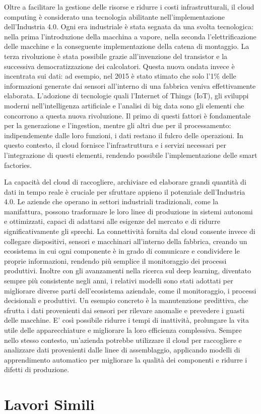 Oltre a facilitare la gestione delle risorse e ridurre i costi infrastrutturali, il cloud computing è considerato una tecnologia abilitante nell'implementazione dell’Industria 4.0. Ogni era industriale è stata segnata da una svolta tecnologica: nella prima l'introduzione della macchina a vapore, nella seconda l'elettrificazione delle macchine e la conseguente implementazione della catena di montaggio. La terza rivoluzione è stata possibile grazie all'invenzione del transistor e la successiva democratizzazione dei calcolatori. Questa nuova ondata invece è incentrata sui dati: ad esempio, nel 2015 è stato stimato che solo l'1\% delle informazioni generate dai sensori all'interno di una fabbrica veniva effettivamente elaborata\cite{b6mckinsey}.  L’adozione di tecnologie quali l’Internet of Things (IoT), gli sviluppi moderni nell'intelligenza artificiale e l’analisi di big data sono gli elementi che concorrono a questa nuova rivoluzione. Il primo di questi fattori è fondamentale per la generazione e l'ingestion, mentre gli altri due per il processamento: indipendemente dalle loro funzioni, i dati restano il fulcro delle operazioni. In questo contesto, il cloud fornisce l'infrastruttura e i servizi necessari per l'integrazione di questi elementi, rendendo possibile l'implementazione delle smart factories. 

La capacità del cloud di raccogliere, archiviare ed elaborare grandi quantità di dati in tempo reale è cruciale per sfruttare appieno il potenziale dell’Industria 4.0. Le aziende che operano in settori industriali tradizionali, come la manifattura, possono trasformare le loro linee di produzione in sistemi autonomi e ottimizzati, capaci di adattarsi alle esigenze del mercato e di ridurre significativamente gli sprechi. La connettività fornita dal cloud consente invece di collegare dispositivi, sensori e macchinari all'interno della fabbrica, creando un ecosistema in cui ogni componente è in grado di comunicare e condividere le proprie informazioni, rendendo più semplice il monitoraggio dei processi produttivi. Inoltre con gli avanzamenti nella ricerca sul deep learning, diventato sempre più consistente negli anni, i relativi modelli sono stati adottati per migliorare diverse parti dell'ecosistema aziendale, come il monitoraggio, i processi decisionali e produttivi. Un esempio concreto è la manutenzione predittiva, che sfrutta i dati provenienti dai sensori per rilevare anomalie e prevedere i guasti delle macchine. E' così possibile ridurre i tempi di inattività, prolungare la vita utile delle apparecchiature e migliorare la loro efficienza complessiva. Sempre nello stesso contesto, un'azienda potrebbe utilizzare il cloud per raccogliere e analizzare dati provenienti dalle linee di assemblaggio, applicando modelli di apprendimento automatico per migliorare la qualità dei componenti e ridurre i difetti di produzione. 

\section{Lavori Simili}